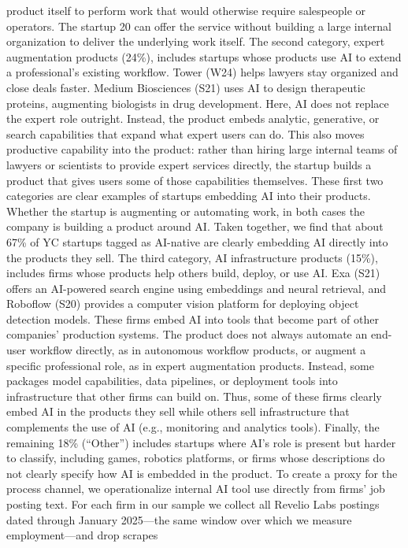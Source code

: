 product itself to perform work that would otherwise require salespeople or operators. The startup
20
can offer the service without building a large internal organization to deliver the underlying work
itself.
The second category, expert augmentation products (24\%), includes startups whose products
use AI to extend a professional’s existing workflow. Tower (W24) helps lawyers stay organized and
close deals faster. Medium Biosciences (S21) uses AI to design therapeutic proteins, augmenting
biologists in drug development. Here, AI does not replace the expert role outright. Instead, the
product embeds analytic, generative, or search capabilities that expand what expert users can do.
This also moves productive capability into the product: rather than hiring large internal teams of
lawyers or scientists to provide expert services directly, the startup builds a product that gives users
some of those capabilities themselves.
These first two categories are clear examples of startups embedding AI into their products.
Whether the startup is augmenting or automating work, in both cases the company is building a
product around AI. Taken together, we find that about 67\% of YC startups tagged as AI-native are
clearly embedding AI directly into the products they sell.
The third category, AI infrastructure products (15\%), includes firms whose products help others
build, deploy, or use AI. Exa (S21) offers an AI-powered search engine using embeddings and neural
retrieval, and Roboflow (S20) provides a computer vision platform for deploying object detection
models. These firms embed AI into tools that become part of other companies’ production systems.
The product does not always automate an end-user workflow directly, as in autonomous workflow
products, or augment a specific professional role, as in expert augmentation products. Instead, some
packages model capabilities, data pipelines, or deployment tools into infrastructure that other firms
can build on. Thus, some of these firms clearly embed AI in the products they sell while others sell
infrastructure that complements the use of AI (e.g., monitoring and analytics tools).
Finally, the remaining 18\% (“Other”) includes startups where AI’s role is present but harder to
classify, including games, robotics platforms, or firms whose descriptions do not clearly specify how
AI is embedded in the product.
To create a proxy for the process channel, we operationalize internal AI tool use directly from
firms’ job posting text. For each firm in our sample we collect all Revelio Labs postings dated
through January 2025—the same window over which we measure employment—and drop scrapes
